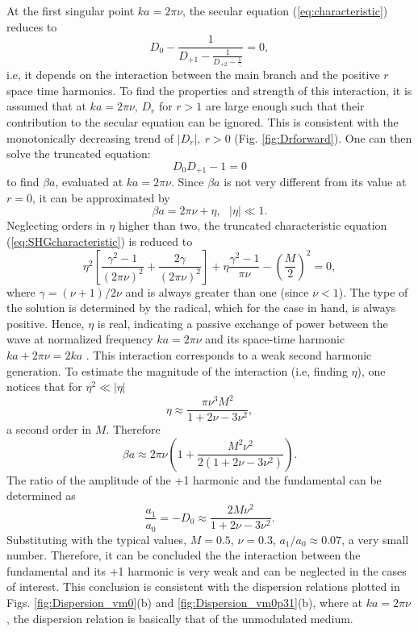 \documentclass[journal]{IEEEtran}
\begin{document}
At the first singular point $ka=2\pi\nu $, the secular equation (\ref{eq:characteristic}) reduces to
\begin{equation}
D_0-\frac{1}{D_{+1}-\frac{1}{D_{+2}-\frac{1}{\ddots}}}=0,
\end{equation}
i.e, it depends on the interaction between the main branch and the positive $r$ space time harmonics. To find the properties and strength of this interaction, it is assumed that at $ka=2\pi\nu$, $D_{r} $ for $r>1$ are large enough such that their contribution to the secular equation can be ignored. This is consistent with the monotonically decreasing trend of $|D_r|,~r>0$ (Fig. \ref{fig:Drforward}). One can then solve the truncated equation:
\begin{equation}
\label{eq:SHGcharacteristic}
D_0D_{+1}-1=0
\end{equation}
to find $\beta a$, evaluated at $ka=2\pi\nu$. Since $\beta a$ is not very different from its value at $r=0$, it can be approximated by
\begin{equation}
\beta a=2\pi\nu+\eta,~~~|\eta|\ll 1.
\end{equation}
Neglecting orders in $\eta$ higher than two, the truncated characteristic equation (\ref{eq:SHGcharacteristic}) is reduced to 
\begin{equation}
\eta^2\left[\frac{\gamma^2-1}{\left(2\pi\nu\right)^2}+\frac{2\gamma}{\left(2\pi\nu\right)^2}\right]+\eta\frac{\gamma^2-1}{\pi\nu}-\left(\frac{M}{2}\right)^2=0,
\end{equation}
where $\gamma=(\nu+1)/2\nu$ and is always greater than one (since $\nu<1$). The type of the solution is determined by the radical, which for the case in hand, is always positive. Hence, $\eta$ is real, indicating a passive exchange of power between the wave at normalized frequency $ka=2\pi\nu$ and its space-time harmonic $ka+2\pi\nu=2ka$ \cite{Louisell1960}. This interaction corresponds to a weak second harmonic generation. To estimate the magnitude of the interaction (i.e, finding $\eta$), one notices that for $\eta^2\ll |\eta|$ 
\begin{equation}
\eta\approx \frac{\pi\nu^3M^2}{1+2\nu-3\nu^2},
\end{equation}
a second order in $M$. Therefore
\begin{equation}
\label{eq:eta_forward_passive}
\beta a\approx2\pi\nu\left(1+\frac{M^2\nu^2}{2\left(1+2\nu-3\nu^2\right)}\right).
\end{equation}
The ratio of the amplitude of the +1 harmonic and the fundamental can be determined as
\begin{equation}
\label{eq:a1_a0_SHG}
\frac{a_1}{a_0}=-D_0\approx\frac{2M\nu^2}{1+2\nu-3\nu^2}.
\end{equation}
Substituting with the typical values, $M=0.5$, $\nu=0.3$, $a_1/a_0\approx 0.07$, a very small number. Therefore, it can be concluded the the interaction between the fundamental and its +1 harmonic is very weak and can be neglected in the cases of interest. This conclusion is consistent with the dispersion relations plotted in Figs. \ref{fig:Dispersion_vm0}(b) and \ref{fig:Dispersion_vm0p31}(b), where at $ka=2\pi\nu$, the dispersion relation is basically that of the unmodulated medium.
\end{document}
